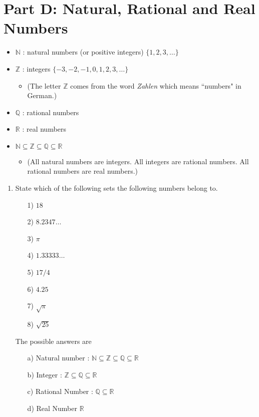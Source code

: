 \documentclass[11pt,a4paper,titlepage,oneside,openany]{article}
\numberwithin{equation}{section}
\numberwithin{algorithm}{section}
\numberwithin{figure}{section}
\numberwithin{table}{section}
\newcommand{\mb}{\mathbb}
\begin{document}
{\section*{Part D: Natural, Rational and Real Numbers}
\begin{itemize}
\item $\mb{N}$ : natural numbers (or positive integers) $\{1,2,3,\ldots\}$
\item $\mb{Z}$ : integers $\{-3,-2,-1,0,1,2,3,\ldots\}$
\begin{itemize}
\item (The letter $\mb{Z}$ comes from the word \emph{Zahlen} which means ``numbers" in German.)
\end{itemize}
\item $\mb{Q}$ : rational numbers
\item $\mb{R}$ : real numbers
\item $\mb{N} \subseteq \mb{Z } \subseteq \mb{Q} \subseteq \mb{R}$
\begin{itemize}
\item (All natural numbers are integers. All integers are rational numbers. All rational numbers are real numbers.)
\end{itemize}
\end{itemize}
\newpage


\begin{enumerate}
\item State which of the following sets the following numbers belong to. 
  \begin{multicols}{4}
    \begin{itemize}
    \item[1)] $18$
    \item[2)] $8.2347\ldots$
    \item[3)] $\pi$
    \item[4)] $1.33333\ldots$
    \item[5)] $17/4$
    \item[6)] $4.25$
    \item[7)] $\sqrt{\pi}$
    \item[8)] $\sqrt{25}$
    \end{itemize}
  \end{multicols}The possible answers are
  \begin{multicols}{2}
    \begin{itemize}
    \item[a)] Natural number : $\mb{N} \subseteq \mb{Z } \subseteq \mb{Q} \subseteq \mb{R}$
    \item[b)] Integer : $ \mb{Z } \subseteq \mb{Q} \subseteq \mb{R}$
    \item[c)] Rational Number : $ \mb{Q} \subseteq \mb{R}$
    \item[d)] Real Number $\mb{R}$


\end{itemize}
\end{multicols}
\end{enumerate}}
\end{document}
